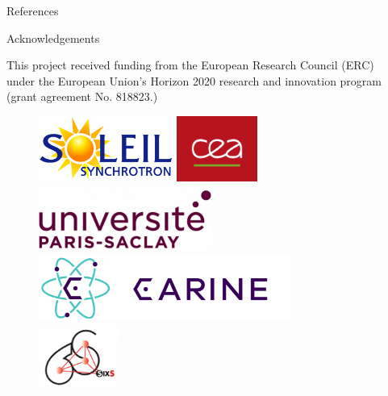 \documentclass[final]{beamer}
\newlength{\sepwidth}
\newlength{\colwidth}
\newcommand{\separatorcolumn}{\begin{column}{\sepwidth}\end{column}}
\begin{document}
\begin{frame}[t]
\begin{columns}[t]
\begin{column}{\colwidth}
    \begin{block}{References}

        \nocite{*}
        \footnotesize{}

    \end{block}

    \begin{block}{Acknowledgements}
    
        \centering

        \footnotesize{This project received funding from the European Research Council (ERC) under the European Union’s Horizon 2020 research and innovation program (grant agreement No. 818823.)}
                
        \begin{figure}
            \centering
            \includegraphics[height=2.15cm]{Figures/Logos/LogoSoleil.png}
            \includegraphics[height=2.15cm]{Figures/Logos/CEA.png}
            \includegraphics[height=2.15cm]{Figures/Logos/ParisSaclayBlanc.png}
            \includegraphics[height=2.15cm]{Figures/Logos/logocarine.png}
            \includegraphics[height=2.15cm]{Figures/Logos/logosixs.jpg}
        \end{figure}
        
    \end{block}
    
\end{column}

\separatorcolumn
\end{columns}
\end{frame}
\end{document}
